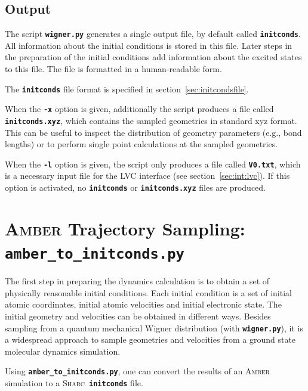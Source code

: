 \documentclass[a4paper,10pt,DIV=15,openany]{scrbook}
\newcommand{\sharc}{\textsc{Sharc}}
\newcommand{\ttt}[1]{\textbf{\texttt{#1}}}
\begin{document}
\subsection{Output}

The script \ttt{wigner.py} generates a single output file, by default called \ttt{initconds}. All information about the initial conditions is stored in this file. Later steps in the preparation of the initial conditions add information about the excited states to this file. The file is formatted in a human-readable form.

The \ttt{initconds} file format is specified in section~\ref{sec:initcondsfile}.

When the \ttt{-x} option is given, additionally the script produces a file called \ttt{initconds.xyz}, which contains the sampled geometries in standard xyz format. This can be useful to inspect the distribution of geometry parameters (e.g., bond lengths) or to perform single point calculations at the sampled geometries.

When the \ttt{-l} option is given, the script only produces a file called \ttt{V0.txt}, which is a necessary input file for the LVC interface (see section~\ref{sec:int:lvc}). If this option is activated, no \ttt{initconds} or \ttt{initconds.xyz} files are produced.




\section{\textsc{Amber} Trajectory Sampling: \ttt{amber\_to\_initconds.py}}\label{sec:amber_to_initconds.py}

The first step in preparing the dynamics calculation is to obtain a set of physically reasonable initial conditions. Each initial condition is a set of initial atomic coordinates, initial atomic velocities and initial electronic state. The initial geometry and velocities can be obtained in different ways. 
Besides sampling from a quantum mechanical Wigner distribution (with \ttt{wigner.py}), it is a widespread approach to sample geometries and velocities from a ground state molecular dynamics simulation.

Using \ttt{amber\_to\_initconds.py}, one can convert the results of an \textsc{Amber} simulation to a \sharc\ \ttt{initconds} file.
\end{document}
